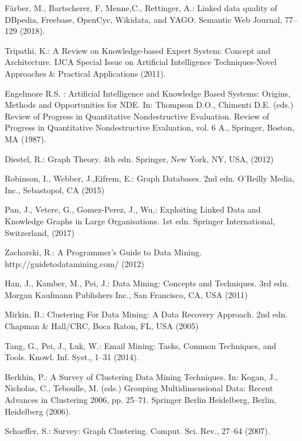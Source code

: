 \documentclass[runningheads]{llncs}
\begin{document}
\begin{thebibliography}{8}
F{\"a}rber, M., Bartscherer, F, Menne,C., Rettinger, A.: Linked data quality of DBpedia, Freebase, OpenCyc, Wikidata, and YAGO. Semantic Web Journal, 77--129 (2018). 

Tripathi, K.: A Review on Knowledge-based Expert System: Concept and Architecture. IJCA Special Issue on Artificial Intelligence Techniques-Novel Approaches \& Practical Applications (2011). 

Engelmore R.S.  : Artificial Intelligence and Knowledge Based Systems: Origins, Methods and Opportunities for NDE. In: Thompson D.O., Chimenti D.E. (eds.) Review of Progress in Quantitative Nondestructive Evaluation. Review of Progress in Quantitative Nondestructive Evaluation, vol. 6 A., 
Springer, Boston, MA (1987). 

Diestel, R.: Graph Theory. 4th edn. Springer, New York, NY, USA, (2012)

Robinson, I., Webber, J.,Eifrem, E.: Graph Databases. 2nd edn. O'Reilly Media, Inc., Sebastopol, CA (2015)

Pan, J., Vetere, G., Gomez-Perez, J., Wu,: Exploiting Linked Data and Knowledge Graphs in Large Organisations. 1st edn. Springer International, Switzerland, (2017)

Zacharski, R.: A Programmer's Guide to Data Mining. http://guidetodatamining.com/ (2012)

Han, J., Kamber, M., Pei, J.: Data Mining: Concepts and Techniques. 3rd edn. Morgan Kaufmann Publishers Inc.,
San Francisco, CA, USA (2011)

Mirkin, B.: Clustering For Data Mining: A Data Recovery Approach. 2nd edn. Chapman \& Hall/CRC,
Boca Raton, FL, USA (2005)

Tang, G., Pei, J., Luk, W.: Email Mining: Tasks, Common Techniques, and Tools. Knowl. Inf. Syst., 1--31 (2014). 

Berkhin, P.: A Survey of Clustering Data Mining Techniques. In: Kogan, J., Nicholas, C., Teboulle, M. (eds.) Grouping Multidimensional Data: Recent Advances in Clustering 2006, pp. 25--71.
Springer Berlin Heidelberg, Berlin, Heidelberg (2006). 

Schaeffer, S.: Survey: Graph Clustering. Comput. Sci. Rev., 27--64 (2007). 


\end{thebibliography}
\end{document}
